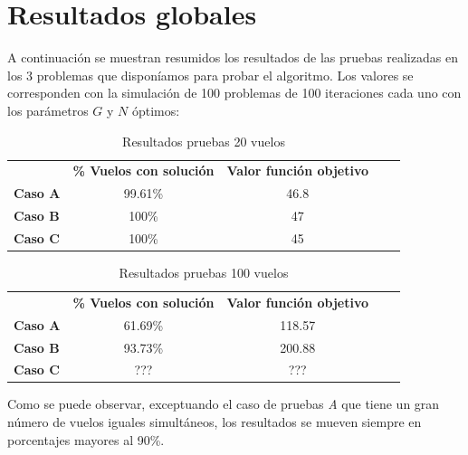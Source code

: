 \section{Resultados globales}
A continuación se muestran resumidos los resultados de las pruebas realizadas en los 3 problemas que disponíamos para probar el algoritmo. Los valores se corresponden con la simulación de 100 problemas de 100 iteraciones cada uno con los parámetros $G$ y $N$ óptimos:
\begin{table}[H]
	\centering
	\caption{Resultados pruebas 20 vuelos}
	\label{resultados 20 vuelos}
	\begin{tabular}{lllll}
		& \textbf{\% Vuelos con solución} & \textbf{Valor función objetivo} & \textbf{} & \textbf{} \\
		\textbf{Caso A} & \multicolumn{1}{c}{99.61\%} &\multicolumn{1}{c}{46.8} & &\\
		\textbf{Caso B} & \multicolumn{1}{c}{100\% }    &\multicolumn{1}{c}{47} & &\\
		\textbf{Caso C} & \multicolumn{1}{c}{100\%}    &\multicolumn{1}{c}{45} & &
	\end{tabular}
\end{table}


\begin{table}[H]
	\centering
	\caption{Resultados pruebas 100 vuelos}
	\label{resultados 100 vuelos}
	\begin{tabular}{lllll}
		& \textbf{\% Vuelos con solución} & \textbf{Valor función objetivo} & \textbf{} & \textbf{} \\
		\textbf{Caso A} & \multicolumn{1}{c}{61.69\%} &\multicolumn{1}{c}{118.57} & &\\
		\textbf{Caso B} & \multicolumn{1}{c}{93.73\%}    &\multicolumn{1}{c}{200.88} & & \\
		\textbf{Caso C} & \multicolumn{1}{c}{???}    &\multicolumn{1}{c}{???} & &
	\end{tabular}
\end{table}

Como se puede observar, exceptuando el caso de pruebas \textit{A} que tiene un gran número de vuelos iguales simultáneos, los resultados se mueven siempre en porcentajes mayores al 90\%.

